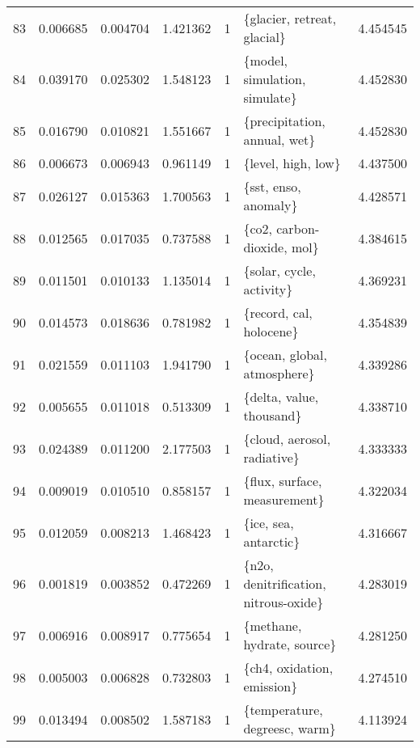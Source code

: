 \begin{tabular}{lrrrrlr}
83 &    0.006685 &  0.004704 &        1.421362 &           1 &             \{glacier, retreat, glacial\} &  4.454545 \\
84 &    0.039170 &  0.025302 &        1.548123 &           1 &           \{model, simulation, simulate\} &  4.452830 \\
85 &    0.016790 &  0.010821 &        1.551667 &           1 &            \{precipitation, annual, wet\} &  4.452830 \\
86 &    0.006673 &  0.006943 &        0.961149 &           1 &                      \{level, high, low\} &  4.437500 \\
87 &    0.026127 &  0.015363 &        1.700563 &           1 &                    \{sst, enso, anomaly\} &  4.428571 \\
88 &    0.012565 &  0.017035 &        0.737588 &           1 &              \{co2, carbon-dioxide, mol\} &  4.384615 \\
89 &    0.011501 &  0.010133 &        1.135014 &           1 &                \{solar, cycle, activity\} &  4.369231 \\
90 &    0.014573 &  0.018636 &        0.781982 &           1 &                 \{record, cal, holocene\} &  4.354839 \\
91 &    0.021559 &  0.011103 &        1.941790 &           1 &             \{ocean, global, atmosphere\} &  4.339286 \\
92 &    0.005655 &  0.011018 &        0.513309 &           1 &                \{delta, value, thousand\} &  4.338710 \\
93 &    0.024389 &  0.011200 &        2.177503 &           1 &             \{cloud, aerosol, radiative\} &  4.333333 \\
94 &    0.009019 &  0.010510 &        0.858157 &           1 &            \{flux, surface, measurement\} &  4.322034 \\
95 &    0.012059 &  0.008213 &        1.468423 &           1 &                   \{ice, sea, antarctic\} &  4.316667 \\
96 &    0.001819 &  0.003852 &        0.472269 &           1 &   \{n2o, denitrification, nitrous-oxide\} &  4.283019 \\
97 &    0.006916 &  0.008917 &        0.775654 &           1 &              \{methane, hydrate, source\} &  4.281250 \\
98 &    0.005003 &  0.006828 &        0.732803 &           1 &              \{ch4, oxidation, emission\} &  4.274510 \\
99 &    0.013494 &  0.008502 &        1.587183 &           1 &           \{temperature, degreesc, warm\} &  4.113924 \\
\bottomrule
\end{tabular}
